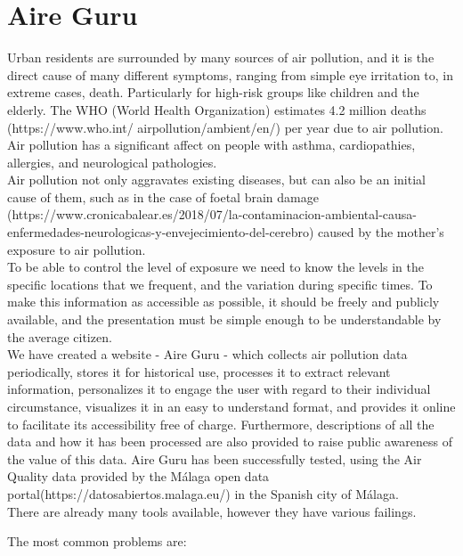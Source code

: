 \section{Aire Guru}

Urban residents are surrounded by many sources of air pollution, and it is the direct cause of many different symptoms,
ranging from simple eye irritation 
to, in extreme cases, death. Particularly for high-risk groups like children and the elderly.
The WHO (World Health Organization) estimates 4.2 million deaths
(https://www.who.int/
airpollution/ambient/en/) per year due to air pollution.
Air pollution has a significant affect on people with asthma, cardiopathies, allergies, and neurological pathologies.\\

Air pollution not only aggravates existing diseases, but can also be an initial cause of them, such as in the case of foetal brain
damage (https://www.cronicabalear.es/2018/07/la-contaminacion-ambiental-causa-enfermedades-neurologicas-y-envejecimiento-del-cerebro)
caused by the mother's exposure to air pollution.\\

To be able to control the level of exposure we need to know the levels
in the specific locations that we frequent, and the variation during specific times.
To make this information as accessible as possible, it should be freely and publicly available, and the presentation
must be simple enough to be understandable by the average citizen.\\


We have created a website - Aire Guru - which collects air pollution data periodically, stores it for historical use, 
processes it to extract relevant information, personalizes it to engage the user with regard to their individual
circumstance, visualizes it in an easy to understand format, and provides it online to facilitate its accessibility free of charge. Furthermore,
descriptions of all the data and how it has been processed are also provided to raise public awareness of the value
of this data. Aire Guru has been successfully tested, using the Air Quality data provided
by the Málaga open data portal(https://datosabiertos.malaga.eu/) in the Spanish city of Málaga.\\

There are already many tools available, however they have various failings.

The most common problems are:

